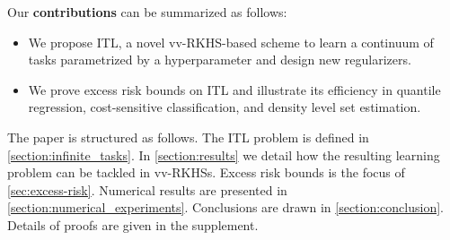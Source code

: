 %
%
Our \textbf{contributions} can be summarized as follows:
\begin{itemize}[labelindent=0cm, leftmargin=*,
                topsep=0cm, partopsep=0cm, parsep=0cm, itemsep=0cm]
    \item We propose ITL, a novel \ac{vv-RKHS}-based scheme to learn a
    continuum of tasks parametrized by a hyperparameter and design new
    regularizers.
    \item We prove excess risk bounds on  ITL and illustrate its efficiency in
    quantile regression, cost-sensitive classification, and density level set
    estimation.
\end{itemize}
The paper is structured as follows. The ITL problem is defined in
\cref{section:infinite_tasks}. In \cref{section:results} we detail how the
resulting learning problem can be tackled in \acp{vv-RKHS}. Excess risk
bounds is the focus of \cref{sec:excess-risk}. Numerical results are presented
in \cref{section:numerical_experiments}.
Conclusions are drawn in
\cref{section:conclusion}.
Details of proofs  are given in the supplement.
